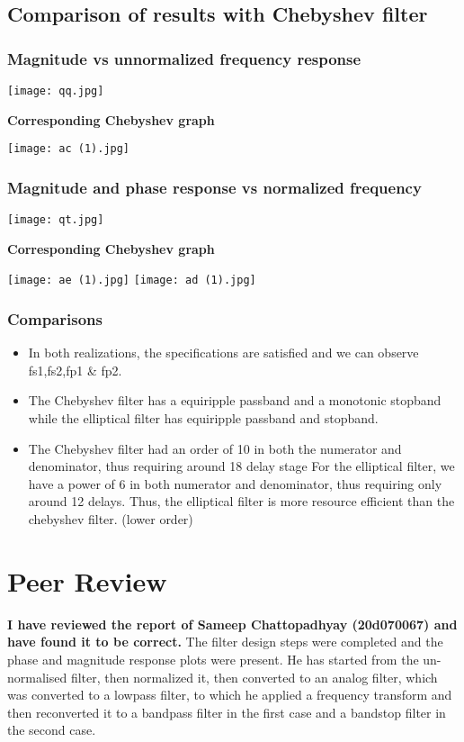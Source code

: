\documentclass[12pt]{article}
\begin{document}
\subsection{Comparison of results with Chebyshev filter}
\subsubsection{Magnitude vs unnormalized frequency response }
\begin{center}
\texttt{[image: qq.jpg]}
\end{center}
\textbf{Corresponding Chebyshev graph}
\begin{center}
\texttt{[image: ac (1).jpg]}
\end{center}
\subsubsection{Magnitude and phase response vs normalized frequency}
\begin{center}
\texttt{[image: qt.jpg]}
\end{center}
\textbf{Corresponding Chebyshev graph}
\begin{center}
\texttt{[image: ae (1).jpg]}
\texttt{[image: ad (1).jpg]}
\end{center}
\subsubsection{Comparisons}
\begin{itemize}
    \item In both realizations, the specifications are satisfied and we can observe fs1,fs2,fp1 \& fp2.
    \item The Chebyshev filter has a equiripple passband and a monotonic stopband while the elliptical filter has equiripple passband and stopband.
    \item The Chebyshev filter had an order of 10 in both the numerator and denominator, thus
requiring around 18 delay stage For the elliptical filter, we have a power of 6 in both numerator and denominator, thus requiring only around 12 delays. Thus, the elliptical filter is more resource efficient than the chebyshev filter. (lower order)
\end{itemize}



\section{Peer Review}
\textbf{I have reviewed the report of Sameep Chattopadhyay (20d070067) and have found it to be correct.} The filter design steps were completed and the phase and magnitude response plots were present. He has started from the un-normalised filter, then normalized it, then converted to an analog filter, which was converted to a lowpass filter, to which he applied a frequency transform and then reconverted it to a bandpass  filter in the first case and a bandstop filter in the second case.
\end{document}

